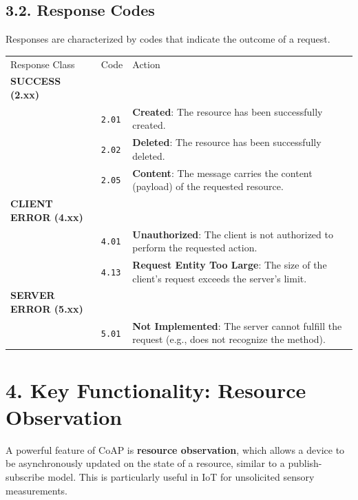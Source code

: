 \documentclass[a4paper, 12pt]{book} %
\begin{document}
\subsection{3.2. Response Codes}\label{response-codes}

Responses are characterized by codes that indicate the outcome of a
request.

\begin{longtable}[]{@{}
  >{\raggedright\arraybackslash}p{}
  >{\raggedright\arraybackslash}p{}
  >{\raggedright\arraybackslash}p{}@{}}
\toprule\noalign{}
\endhead
\bottomrule\noalign{}
\endlastfoot
Response Class & Code & Action \\
\textbf{SUCCESS (2.xx)} & & \\
& \texttt{2.01} & \textbf{Created}: The resource has been successfully
created. \\
& \texttt{2.02} & \textbf{Deleted}: The resource has been successfully
deleted. \\
& \texttt{2.05} & \textbf{Content}: The message carries the content
(payload) of the requested resource. \\
\textbf{CLIENT ERROR (4.xx)} & & \\
& \texttt{4.01} & \textbf{Unauthorized}: The client is not authorized to
perform the requested action. \\
& \texttt{4.13} & \textbf{Request Entity Too Large}: The size of the
client's request exceeds the server's limit. \\
\textbf{SERVER ERROR (5.xx)} & & \\
& \texttt{5.01} & \textbf{Not Implemented}: The server cannot fulfill
the request (e.g., does not recognize the method). \\
\end{longtable}

\section{4. Key Functionality: Resource
Observation}\label{key-functionality-resource-observation}

A powerful feature of CoAP is \textbf{resource observation}, which
allows a device to be asynchronously updated on the state of a resource,
similar to a publish-subscribe model. This is particularly useful in IoT
for unsolicited sensory measurements.
\end{document}
